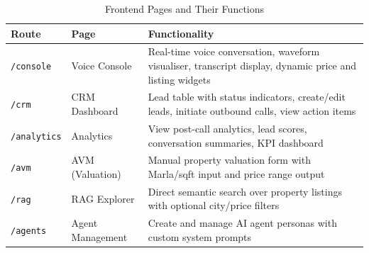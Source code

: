 \begin{table}[H]
\centering
\caption{Frontend Pages and Their Functions}
\renewcommand{\arraystretch}{1.3}
\begin{tabular}{|l|l|p{6.5cm}|}
\hline
\textbf{Route} & \textbf{Page} & \textbf{Functionality} \\ \hline
\texttt{/console} & Voice Console & Real-time voice conversation, waveform visualiser, transcript display, dynamic price and listing widgets \\ \hline
\texttt{/crm} & CRM Dashboard & Lead table with status indicators, create/edit leads, initiate outbound calls, view action items \\ \hline
\texttt{/analytics} & Analytics & View post-call analytics, lead scores, conversation summaries, KPI dashboard \\ \hline
\texttt{/avm} & AVM (Valuation) & Manual property valuation form with Marla/sqft input and price range output \\ \hline
\texttt{/rag} & RAG Explorer & Direct semantic search over property listings with optional city/price filters \\ \hline
\texttt{/agents} & Agent Management & Create and manage AI agent personas with custom system prompts \\ \hline
\end{tabular}
\label{tab:frontend-pages}
\end{table}
